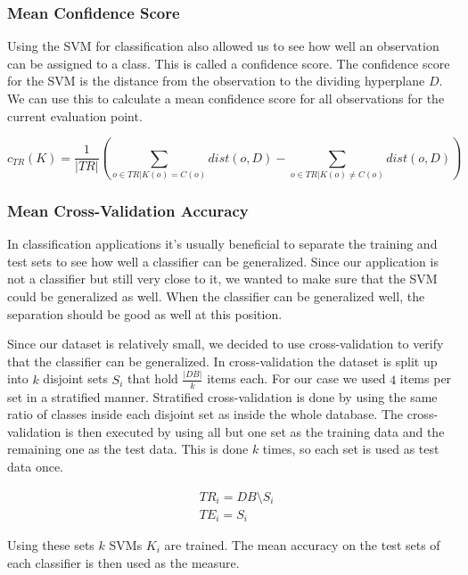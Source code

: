 \documentclass[pdftex,12pt,a4paper]{report}
\begin{document}
\subsubsection{Mean Confidence Score}

Using the SVM for classification also allowed us to see how well an observation can be assigned to a class. This
is called a confidence score. The confidence score for the SVM is the distance from the observation to the dividing
hyperplane $D$. We can use this to calculate a mean confidence score for all observations for the current evaluation point.

\begin{equation}
c_{TR}(K) = \frac{1}{|TR|} (\sum_{o \in TR | K(o) = C(o)} dist(o, D) - \sum_{o \in TR | K(o) \neq C(o)} dist(o, D))
\end{equation}

\subsubsection{Mean Cross-Validation Accuracy}

In classification applications it's usually beneficial to separate the training and test sets to see how well a
classifier can be generalized. Since our application is not a classifier but still very close to it, we wanted
to make sure that the SVM could be generalized as well. When the classifier can be generalized well, the separation
should be good as well at this position.

Since our dataset is relatively small, we decided to use cross-validation to verify that the classifier can be
generalized. In cross-validation the dataset is split up into $k$ disjoint sets $S_i$ that hold $\frac{|DB|}{k}$ items each. For our case we used $4$ items per set in a stratified manner. Stratified cross-validation is done by using the same ratio of classes inside each disjoint set as inside the whole database. The cross-validation is then
executed by using all but one set as the training data and the remaining one as the test data. This is done $k$ times, so each set is used as test data once.

\begin{equation}
\begin{split}
& TR_i = DB \setminus S_i \\
& TE_i = S_i 
\end{split}
\end{equation}

Using these sets $k$ SVMs $K_i$ are trained. The mean accuracy on the test sets of each classifier is then used
as the measure.
\end{document}
